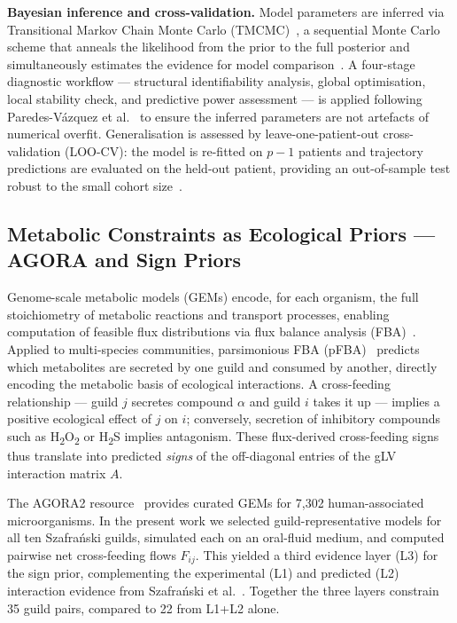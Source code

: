 \textbf{Bayesian inference and cross-validation.}
Model parameters are inferred via Transitional Markov Chain Monte Carlo
(TMCMC)~\cite{ChingChen2007TMCMC, Betz2016TMCMC}, a sequential Monte Carlo scheme
that anneals the likelihood from the prior to the full posterior and simultaneously
estimates the evidence for model comparison~\cite{Chopin2002SMC}.
A four-stage diagnostic workflow --- structural identifiability analysis, global
optimisation, local stability check, and predictive power assessment --- is applied
following Paredes-Vázquez et al.~\cite{Paredes2025ODECalib} to ensure the inferred
parameters are not artefacts of numerical overfit.
Generalisation is assessed by leave-one-patient-out cross-validation (LOO-CV): the
model is re-fitted on $p-1$ patients and trajectory predictions are evaluated on the
held-out patient, providing an out-of-sample test robust to the small cohort
size~\cite{Gelman2013BDA, Gibson2021MDSINE2}.

\subsection{Metabolic Constraints as Ecological Priors --- AGORA and Sign Priors}
\label{sec:intro_prior}

Genome-scale metabolic models (GEMs) encode, for each organism, the full stoichiometry
of metabolic reactions and transport processes, enabling computation of feasible flux
distributions via flux balance analysis (FBA)~\cite{OrthThiele2010WhatIsFBA}.
Applied to multi-species communities, parsimonious FBA (pFBA)~\cite{Lewis2012pFBA}
predicts which metabolites are secreted by one guild and consumed by another, directly
encoding the metabolic basis of ecological interactions.
A cross-feeding relationship --- guild $j$ secretes compound $\alpha$ and guild $i$
takes it up --- implies a positive ecological effect of $j$ on $i$; conversely,
secretion of inhibitory compounds such as H\textsubscript{2}O\textsubscript{2} or
H\textsubscript{2}S implies antagonism.
These flux-derived cross-feeding signs thus translate into predicted \emph{signs}
of the off-diagonal entries of the gLV interaction matrix $A$.

The AGORA2 resource~\cite{Heinken2023AGORA2} provides curated GEMs for 7{,}302
human-associated microorganisms.
In the present work we selected guild-representative models for all ten Szafra\'nski
guilds, simulated each on an oral-fluid medium, and computed pairwise net cross-feeding
flows $F_{ij}$.
This yielded a third evidence layer (L3) for the sign prior, complementing the
experimental (L1) and predicted (L2) interaction evidence from Szafra\'nski
et al.~\cite{Szafranski2025CT}.
Together the three layers constrain 35 guild pairs, compared to 22 from L1+L2 alone.

